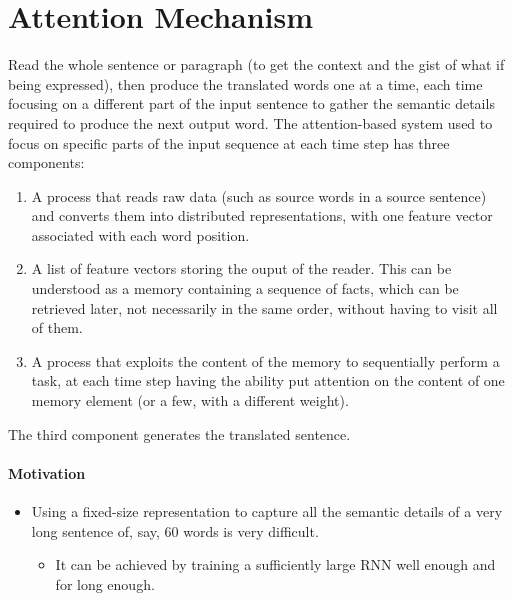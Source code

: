 \documentclass[12pt, a4paper]{article}
\begin{document}
\section{Attention Mechanism}

Read the whole sentence or paragraph (to get the context and the gist of what if being expressed), then produce the translated words one at a time, each time focusing on a different part of the input sentence to gather the semantic details required to produce the next output word.
\newline
The attention-based system used to focus on specific parts of the input sequence at each time step has three components:
\begin{enumerate}
    \item A process that reads raw data (such as source words in a source sentence) and converts them into distributed representations, with one feature vector associated with each word position.
    \item A list of feature vectors storing the ouput of the reader. This can be understood as a memory containing a sequence of facts, which can be retrieved later, not necessarily in the same order, without having to visit all of them.
    \item A process that exploits the content of the memory to sequentially perform a task, at each time step having the ability put attention on the content of one memory element (or a few, with a different weight).
\end{enumerate}
The third component generates the translated sentence.

\paragraph{Motivation}
\begin{itemize}
    \item{
        Using a fixed-size representation to capture all the semantic details of a very long sentence of, say, 60 words is very difficult.
        \begin{itemize}
            \item It can be achieved by training a sufficiently large RNN well enough and for long enough.
        \end{itemize}
    }
\end{itemize}
\end{document}

